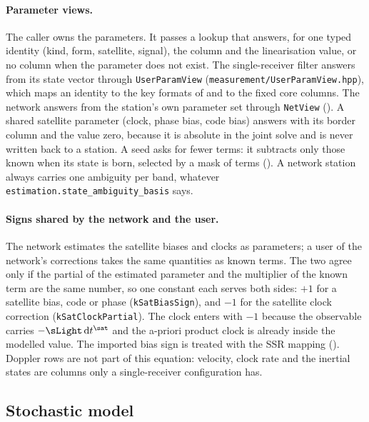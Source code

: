 \paragraph{Parameter views.}
The caller owns the parameters.  It passes a lookup that answers, for one
typed identity (kind, form, satellite, signal), the column and the
linearisation value, or no column when the parameter does not exist.  The
single-receiver filter answers from its state vector through
\texttt{UserParamView} (\texttt{measurement/UserParamView.hpp}), which maps
an identity to the key formats of  and to the
fixed core columns.  The network answers from the station's own parameter
set through \texttt{NetView} ().  A shared satellite
parameter (clock, phase bias, code bias) answers with its border column and
the value zero, because it is absolute in the joint solve and is never
written back to a station.  A seed asks for fewer terms: it subtracts only
those known when its state is born, selected by a mask of terms
().  A network station always carries one ambiguity
per band, whatever \texttt{estimation.state\_ambiguity\_basis} says.

\paragraph{Signs shared by the network and the user.}
The network estimates the satellite biases and clocks as parameters; a user
of the network's corrections takes the same quantities as known terms.  The
two agree only if the partial of the estimated parameter and the
multiplier of the known term are the same number, so one constant each
serves both sides: $+1$ for a satellite bias, code or phase
(\texttt{kSatBiasSign}), and $-1$ for the satellite clock correction
(\texttt{kSatClockPartial}).  The clock enters with $-1$ because the
observable carries $-\sLight\,\mathrm{d}t^\sat$ and the a-priori product
clock is already inside the modelled value.  The imported bias sign is
treated with the SSR mapping ().
Doppler rows are not part of this equation: velocity, clock rate and the
inertial states are columns only a single-receiver configuration has.

\subsection{Stochastic model}

